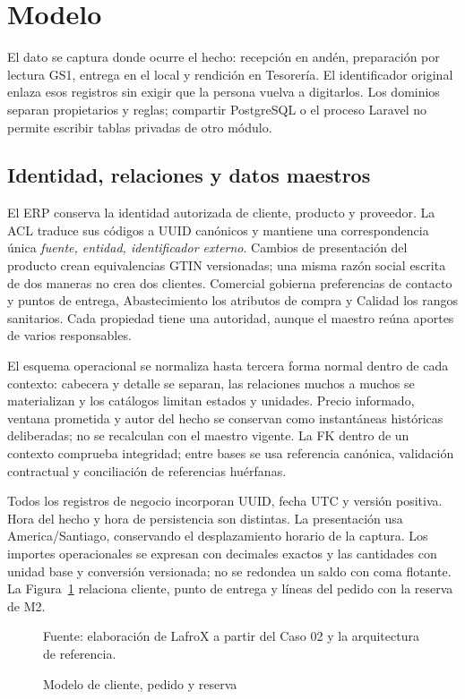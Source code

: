 \section{Modelo}
\label{sec:5-modelo}
El dato se captura donde ocurre el hecho: recepción en andén, preparación por lectura GS1, entrega en el local y rendición en Tesorería. El identificador original enlaza esos registros sin exigir que la persona vuelva a digitarlos. Los dominios separan propietarios y reglas; compartir PostgreSQL o el proceso Laravel no permite escribir tablas privadas de otro módulo.

\subsection{Identidad, relaciones y datos maestros}
El ERP conserva la identidad autorizada de cliente, producto y proveedor. La ACL traduce sus códigos a UUID canónicos y mantiene una correspondencia única \emph{fuente, entidad, identificador externo}. Cambios de presentación del producto crean equivalencias GTIN versionadas; una misma razón social escrita de dos maneras no crea dos clientes. Comercial gobierna preferencias de contacto y puntos de entrega, Abastecimiento los atributos de compra y Calidad los rangos sanitarios. Cada propiedad tiene una autoridad, aunque el maestro reúna aportes de varios responsables.

El esquema operacional se normaliza hasta tercera forma normal dentro de cada contexto: cabecera y detalle se separan, las relaciones muchos a muchos se materializan y los catálogos limitan estados y unidades. Precio informado, ventana prometida y autor del hecho se conservan como instantáneas históricas deliberadas; no se recalculan con el maestro vigente. La FK dentro de un contexto comprueba integridad; entre bases se usa referencia canónica, validación contractual y conciliación de referencias huérfanas.

Todos los registros de negocio incorporan UUID, fecha UTC y versión positiva. Hora del hecho y hora de persistencia son distintas. La presentación usa America/Santiago, conservando el desplazamiento horario de la captura. Los importes operacionales se expresan con decimales exactos y las cantidades con unidad base y conversión versionada; no se redondea un saldo con coma flotante.
La Figura~\ref{fig:5-pedido} relaciona cliente, punto de entrega y líneas del pedido con la reserva de M2.

\begin{figure}[htbp]
\centering

\caption{Modelo de cliente, pedido y reserva}
\label{fig:5-pedido}
{\fontsize{9pt}{11pt}\selectfont Fuente: elaboración de LafroX a partir del Caso 02 y la arquitectura de referencia.}
\end{figure}\FloatBarrier


